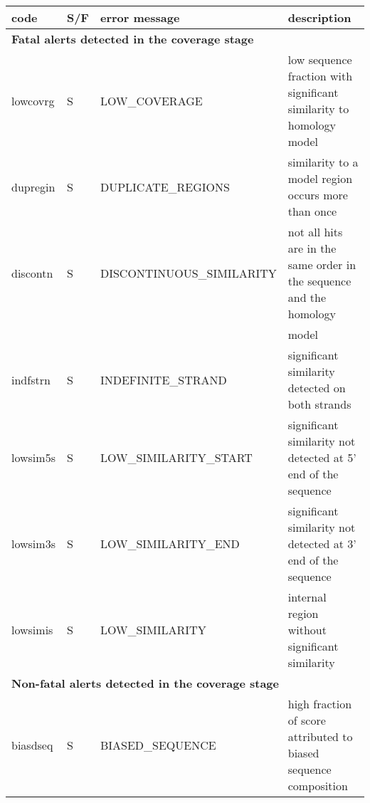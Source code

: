 \documentclass{bmcart}
\begin{document}
\begin{table}[h!]
\begin{tabular}{|l|l|l|l|}
\hline
\textbf{code} & \textbf{S/F} & \textbf{error message} & \textbf{description}  \\
\hline 
\multicolumn{4}{|l|}{\textbf{Fatal alerts detected in the coverage stage}} \\
\hline 
lowcovrg       & S & LOW\_COVERAGE                    & low sequence fraction with significant similarity to homology model \\
dupregin       & S & DUPLICATE\_REGIONS               & similarity to a model region occurs more than once \\
discontn       & S & DISCONTINUOUS\_SIMILARITY        & not all hits are in the same order in the sequence and the homology \\
               &   &                                  &  model \\
indfstrn       & S & INDEFINITE\_STRAND               & significant similarity detected on both strands \\
lowsim5s       & S & LOW\_SIMILARITY\_START           & significant similarity not detected at 5' end of the sequence \\
lowsim3s       & S & LOW\_SIMILARITY\_END             & significant similarity not detected at 3' end of the sequence \\
lowsimis       & S & LOW\_SIMILARITY                  & internal region without significant similarity \\
\hline 
\multicolumn{4}{|l|}{\textbf{Non-fatal alerts detected in the coverage stage}} \\
\hline 
biasdseq       & S & BIASED\_SEQUENCE                 & high fraction of score attributed to biased sequence composition \\
\hline 
\end{tabular}
\end{table}
\end{document}
